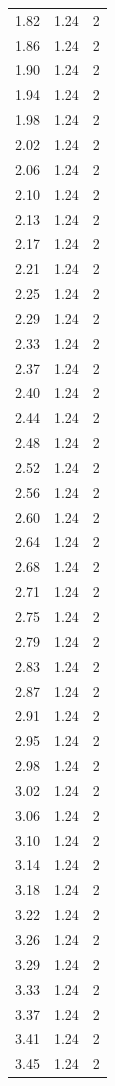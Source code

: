 \begin{longtable}{lrr}
  1.82 & 1.24 & 2 \\
  1.86 & 1.24 & 2 \\
  1.90 & 1.24 & 2 \\
  1.94 & 1.24 & 2 \\
  1.98 & 1.24 & 2 \\
  2.02 & 1.24 & 2 \\
  2.06 & 1.24 & 2 \\
  2.10 & 1.24 & 2 \\
  2.13 & 1.24 & 2 \\
  2.17 & 1.24 & 2 \\
  2.21 & 1.24 & 2 \\
  2.25 & 1.24 & 2 \\
  2.29 & 1.24 & 2 \\
  2.33 & 1.24 & 2 \\
  2.37 & 1.24 & 2 \\
  2.40 & 1.24 & 2 \\
  2.44 & 1.24 & 2 \\
  2.48 & 1.24 & 2 \\
  2.52 & 1.24 & 2 \\
  2.56 & 1.24 & 2 \\
  2.60 & 1.24 & 2 \\
  2.64 & 1.24 & 2 \\
  2.68 & 1.24 & 2 \\
  2.71 & 1.24 & 2 \\
  2.75 & 1.24 & 2 \\
  2.79 & 1.24 & 2 \\
  2.83 & 1.24 & 2 \\
  2.87 & 1.24 & 2 \\
  2.91 & 1.24 & 2 \\
  2.95 & 1.24 & 2 \\
  2.98 & 1.24 & 2 \\
  3.02 & 1.24 & 2 \\
  3.06 & 1.24 & 2 \\
  3.10 & 1.24 & 2 \\
  3.14 & 1.24 & 2 \\
  3.18 & 1.24 & 2 \\
  3.22 & 1.24 & 2 \\
  3.26 & 1.24 & 2 \\
  3.29 & 1.24 & 2 \\
  3.33 & 1.24 & 2 \\
  3.37 & 1.24 & 2 \\
  3.41 & 1.24 & 2 \\
  3.45 & 1.24 & 2 \\

\end{longtable}
